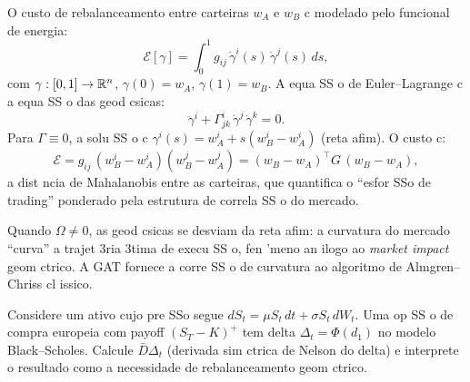 \begin{sol}
O custo de rebalanceamento entre carteiras $w_A$ e $w_B$ c modelado pelo funcional de energia:
\begin{equation}
 \mathcal{E}[\gamma] = \int_0^1 g_{ij}\,\dot\gamma^i(s)\,\dot\gamma^j(s)\,ds,
\end{equation}
com $\gamma:[0,1]\to\mathbb{R}^n$, $\gamma(0)=w_A$, $\gamma(1)=w_B$. A equa SS o de Euler--Lagrange c a equa SS o das geod csicas:
\begin{equation}
 \ddot\gamma^i + \Gamma^i_{jk}\,\dot\gamma^j\,\dot\gamma^k = 0.
\end{equation}
Para $\Gamma\equiv 0$, a solu SS o c $\gamma^i(s) = w_A^i + s(w_B^i - w_A^i)$ (reta afim). O custo c:
\begin{equation}
 \mathcal{E} = g_{ij}\,(w_B^i - w_A^i)(w_B^j - w_A^j) = (w_B - w_A)^\top G\,(w_B - w_A),
\end{equation}
a dist ncia de Mahalanobis entre as carteiras, que quantifica o ``esfor SSo de trading'' ponderado pela estrutura de correla SS o do mercado.

Quando $\Omega\neq 0$, as geod csicas se desviam da reta afim: a curvatura do mercado ``curva'' a trajet 3ria 3tima de execu SS o, fen 'meno an ilogo ao \textit{market impact} geom ctrico. A GAT fornece a corre SS o de curvatura ao algoritmo de Almgren--Chriss cl issico.
\end{sol}

\begin{exer}
\label{ex:nelson_delta}
Considere um ativo cujo pre SSo segue $dS_t = \mu S_t\,dt + \sigma S_t\,dW_t$. Uma op SS o de compra europeia com payoff $(S_T-K)^+$ tem delta $\Delta_t = \Phi(d_1)$ no modelo Black--Scholes. Calcule $\bar{D}\Delta_t$ (derivada sim ctrica de Nelson do delta) e interprete o resultado como a necessidade de rebalanceamento geom ctrico.
\end{exer}


